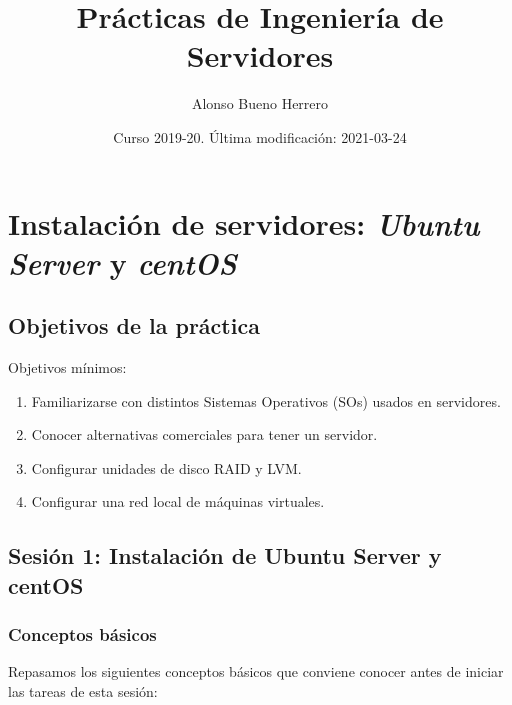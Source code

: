 \documentclass[
]{book}
\title{Prácticas de Ingeniería de Servidores}
\author{Alonso Bueno Herrero}
\date{Curso 2019-20. Última modificación: 2021-03-24}
\providecommand{\tightlist}{%
  \setlength{\itemsep}{0pt}\setlength{\parskip}{0pt}}
\begin{document}
\maketitle

{
\setcounter{tocdepth}{1}
\tableofcontents
}
\hypertarget{p1}{%
\chapter{\texorpdfstring{Instalación de servidores: \textbf{\emph{Ubuntu Server}} y \textbf{\emph{centOS}}}{Instalación de servidores: Ubuntu Server y centOS}}\label{p1}}

\hypertarget{objetivos-de-la-pruxe1ctica}{%
\section{Objetivos de la práctica}\label{objetivos-de-la-pruxe1ctica}}

Objetivos mínimos:

\begin{enumerate}
\def\labelenumi{\arabic{enumi}.}
\tightlist
\item
  Familiarizarse con distintos Sistemas Operativos (SOs) usados en servidores.
\item
  Conocer alternativas comerciales para tener un servidor.
\item
  Configurar unidades de disco RAID y LVM.
\item
  Configurar una red local de máquinas virtuales.
\end{enumerate}

\hypertarget{sesiuxf3n-1-instalaciuxf3n-de-ubuntu-server-y-centos}{%
\section{Sesión 1: Instalación de Ubuntu Server y centOS}\label{sesiuxf3n-1-instalaciuxf3n-de-ubuntu-server-y-centos}}

\hypertarget{conceptos-buxe1sicos}{%
\subsection{Conceptos básicos}\label{conceptos-buxe1sicos}}

Repasamos los siguientes conceptos básicos que conviene conocer antes de iniciar las tareas de esta sesión:
\end{document}
